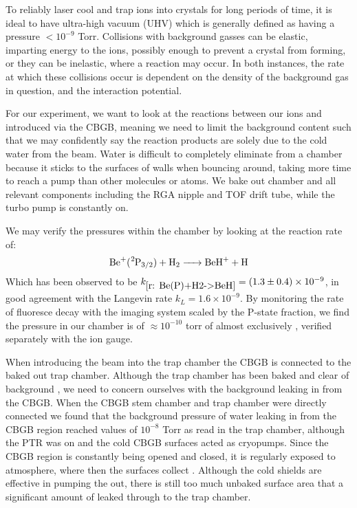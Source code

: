 To reliably laser cool and trap ions into crystals for long periods of time, it is ideal to have ultra-high vacuum (UHV) which is generally defined as having a pressure $<10^{-9}$ Torr. Collisions with background gasses can be elastic, imparting energy to the ions, possibly enough to prevent a crystal from forming, or they can be inelastic, where a reaction may occur. In both instances, the rate at which these collisions occur is dependent on the density of the background gas in question, and the interaction potential.

For our experiment, we want to look at the reactions between our ions and  introduced via the CBGB, meaning we need to limit the background  content such that we may confidently say the reaction products are solely due to the cold water from the beam. Water is difficult to completely eliminate from a chamber because it sticks to the surfaces of walls when bouncing around, taking more time to reach a pump than other molecules or atoms. We bake out chamber and all relevant components including the RGA nipple and TOF drift tube, while the turbo pump is constantly on.

We may verify the pressures within the chamber by looking at the reaction rate of:
\begin{equation}
	\ce{Be+(^2P3/2) + H2 -> BeH+ + H}
	\label{r: Be(P)+H2->BeH}
\end{equation}
Which has been observed to be $k_{\ref{r: Be(P)+H2->BeH}} = (1.3 \pm 0.4)\times 10^{-9}$, in good agreement with the Langevin rate $k_L=1.6 \times 10^{-9}$.\cite{Roth2006} By monitoring the rate of fluoresce decay with the imaging system scaled by the P-state fraction, we find the pressure in our chamber is of $\approx 10^{-10}$ torr of almost exclusively , verified separately with the ion gauge.

When introducing the beam into the trap chamber the CBGB is connected to the baked out trap chamber. Although the trap chamber has been baked and clear of background , we need to concern ourselves with the background  leaking in from the CBGB. When the CBGB stem chamber and trap chamber were directly connected we found that the background pressure of water leaking in from the CBGB region reached values of $10^{-8}$ Torr as read in the trap chamber, although the PTR was on and the cold CBGB surfaces acted as cryopumps. Since the CBGB region is constantly being opened and closed, it is regularly exposed to atmosphere, where then the surfaces collect . Although the cold shields are effective in pumping the  out, there is still too much unbaked surface area that a significant amount of  leaked through to the trap chamber.

